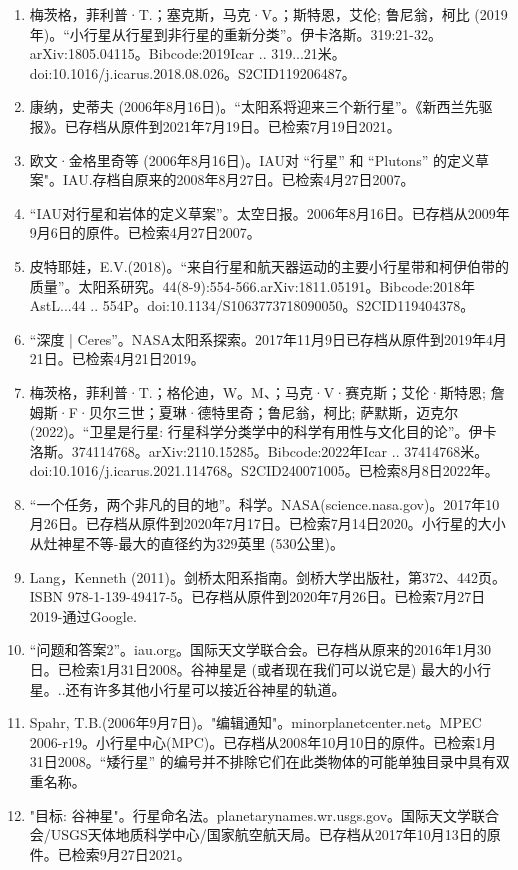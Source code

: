 \begin{enumerate}
\item 梅茨格，菲利普·T.；塞克斯，马克·V。；斯特恩，艾伦; 鲁尼翁，柯比 (2019年)。“小行星从行星到非行星的重新分类”。伊卡洛斯。319:21-32。arXiv:1805.04115。Bibcode:2019Icar .. 319...21米。doi:10.1016/j.icarus.2018.08.026。S2CID119206487。 
\item 康纳，史蒂夫 (2006年8月16日)。“太阳系将迎来三个新行星”。《新西兰先驱报》。已存档从原件到2021年7月19日。已检索7月19日2021。
\item 欧文·金格里奇等 (2006年8月16日)。IAU对 “行星” 和 “Plutons” 的定义草案"。IAU.存档自原来的2008年8月27日。已检索4月27日2007。
\item “IAU对行星和岩体的定义草案”。太空日报。2006年8月16日。已存档从2009年9月6日的原件。已检索4月27日2007。
\item 皮特耶娃，E.V.(2018)。“来自行星和航天器运动的主要小行星带和柯伊伯带的质量”。太阳系研究。44(8-9):554-566.arXiv:1811.05191。Bibcode:2018年AstL...44 .. 554P。doi:10.1134/S1063773718090050。S2CID119404378。 
\item “深度 | Ceres”。NASA太阳系探索。2017年11月9日已存档从原件到2019年4月21日。已检索4月21日2019。
\item 梅茨格，菲利普·T.；格伦迪，W。M、；马克·V·赛克斯；艾伦·斯特恩; 詹姆斯·F·贝尔三世；夏琳·德特里奇；鲁尼翁，柯比; 萨默斯，迈克尔 (2022)。“卫星是行星: 行星科学分类学中的科学有用性与文化目的论”。伊卡洛斯。374114768。arXiv:2110.15285。Bibcode:2022年Icar .. 37414768米。doi:10.1016/j.icarus.2021.114768。S2CID240071005。已检索8月8日2022年。 
\item “一个任务，两个非凡的目的地”。科学。NASA(science.nasa.gov)。2017年10月26日。已存档从原件到2020年7月17日。已检索7月14日2020。小行星的大小从灶神星不等-最大的直径约为329英里 (530公里)。
\item Lang，Kenneth (2011)。剑桥太阳系指南。剑桥大学出版社，第372、442页。ISBN 978-1-139-49417-5。已存档从原件到2020年7月26日。已检索7月27日2019-通过Google.
\item “问题和答案2”。iau.org。国际天文学联合会。已存档从原来的2016年1月30日。已检索1月31日2008。谷神星是 (或者现在我们可以说它是) 最大的小行星。..还有许多其他小行星可以接近谷神星的轨道。
\item Spahr, T.B.(2006年9月7日)。"编辑通知"。minorplanetcenter.net。MPEC 2006-r19。小行星中心(MPC)。已存档从2008年10月10日的原件。已检索1月31日2008。“矮行星” 的编号并不排除它们在此类物体的可能单独目录中具有双重名称。
\item "目标: 谷神星"。行星命名法。planetarynames.wr.usgs.gov。国际天文学联合会/USGS天体地质科学中心/国家航空航天局。已存档从2017年10月13日的原件。已检索9月27日2021。

\end{enumerate}
